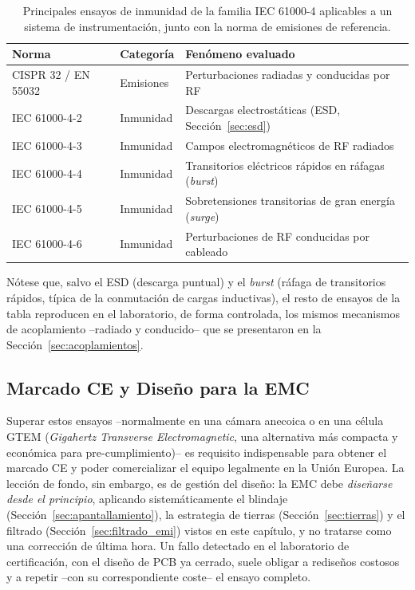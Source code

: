 \begin{table}[ht]
    \centering
    \small
    \forceversofloat %
    \caption[Principales ensayos de la familia IEC 61000-4.]{Principales ensayos de inmunidad de la familia IEC 61000-4 aplicables a un sistema de instrumentación, junto con la norma de emisiones de referencia.\protect\label{tab:normativa_emc}}
    \setlength{\tabcolsep}{3pt}
    \begin{tabularx}{\linewidth}{@{} >{\centering\arraybackslash}X >{\centering\arraybackslash}X >{\centering\arraybackslash}X @{}}
        \toprule
        \textbf{Norma} & \textbf{Categoría} & \textbf{Fenómeno evaluado} \\
        \midrule
        CISPR 32 / EN 55032 & Emisiones & Perturbaciones radiadas y conducidas por RF \\
        IEC 61000-4-2 & Inmunidad & Descargas electrostáticas (ESD, Sección~\ref{sec:esd}) \\
        IEC 61000-4-3 & Inmunidad & Campos electromagnéticos de RF radiados \\
        IEC 61000-4-4 & Inmunidad & Transitorios eléctricos rápidos en ráfagas (\textit{burst}) \\
        IEC 61000-4-5 & Inmunidad & Sobretensiones transitorias de gran energía (\textit{surge}) \\
        IEC 61000-4-6 & Inmunidad & Perturbaciones de RF conducidas por cableado \\
        \bottomrule
    \end{tabularx}
\end{table}

Nótese que, salvo el ESD (descarga puntual) y el \textit{burst} (ráfaga de transitorios rápidos, típica de la conmutación de cargas inductivas), el resto de ensayos de la tabla reproducen en el laboratorio, de forma controlada, los mismos mecanismos de acoplamiento --radiado y conducido-- que se presentaron en la Sección~\ref{sec:acoplamientos}.

\subsection{Marcado CE y Diseño para la EMC}\label{sub:marcado_ce}

Superar estos ensayos --normalmente en una cámara anecoica o en una célula GTEM (\textit{Gigahertz Transverse Electromagnetic}, una alternativa más compacta y económica para pre-cumplimiento)-- es requisito indispensable para obtener el marcado CE y poder comercializar el equipo legalmente en la Unión Europea. La lección de fondo, sin embargo, es de gestión del diseño: la EMC debe \emph{diseñarse desde el principio}, aplicando sistemáticamente el blindaje (Sección~\ref{sec:apantallamiento}), la estrategia de tierras (Sección~\ref{sec:tierras}) y el filtrado (Sección~\ref{sec:filtrado_emi}) vistos en este capítulo, y no tratarse como una corrección de última hora. Un fallo detectado en el laboratorio de certificación, con el diseño de PCB ya cerrado, suele obligar a rediseños costosos y a repetir --con su correspondiente coste-- el ensayo completo.

